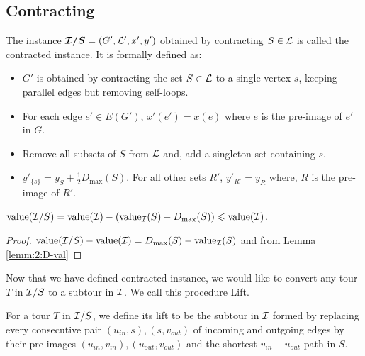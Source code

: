 \documentclass[./main.tex]{subfiles}
\begin{document}
	\subsection{Contracting}
	\begin{definition}
		The instance $\bm{\mathcal{I}/S} = (G', \mathcal{L}', x', y')$ obtained by contracting $S\in \mathcal{L}$ is called the contracted instance. It is formally defined as:
		\begin{itemize}[-]
			\item $G'$ is obtained by contracting the set $S \in \mathcal{L}$ to a single vertex $s$, keeping parallel edges but removing self-loops.
			\item For each edge $e' \in E(G')$, $x'(e') = x(e)$ where $e$ is the pre-image of $e'$ in $G$.
			\item Remove all subsets of $S$ from $\mathcal{L}$ and, add a singleton set containing $s$.
			\item $y'_{\{s\}} = y_S + \frac{1}{2}D_{\max}(S)$. For all other sets $R'$, $y'_{R'} = y_R$ where, $R$ is the pre-image of $R'$.
		\end{itemize}
	\end{definition}\vspace{2mm}
	\begin{fact}\label{fact:3:val-c}
		$\textup{value}(\mathcal{I}/S) = \textup{value}(\mathcal{I}) - (\textup{value}_{\mathcal{I}}(S) - D_{\max}(S)) \leqslant \textup{value}(\mathcal{I})$.
	\end{fact}
	\begin{proof}
		$\textup{value}(\mathcal{I}/S) - \textup{value}(\mathcal{I}) = D_{\max}(S) - \textup{value}_{\mathcal{I}}(S)$ and from \hyperref[lemm:2:D-val]{Lemma \ref{lemm:2:D-val}}
	\end{proof}
	
	Now that we have defined contracted instance, we would like to convert any tour $T$ in $\mathcal{I}/S$ to a subtour in $\mathcal{I}$. We call this procedure Lift.
	
	\begin{definition}
		For a tour $T$ in $\mathcal{I}/S$, we define its lift to be the subtour in $\mathcal{I}$ formed by replacing every consecutive pair $(u_{in}, s), (s, v_{out})$ of incoming and outgoing edges by their pre-images $(u_{in}, v_{in}), (u_{out}, v_{out})$ and the shortest $v_{in} - u_{out}$ path in $S$.
	\end{definition}\vspace{2mm}
	
\end{document}
